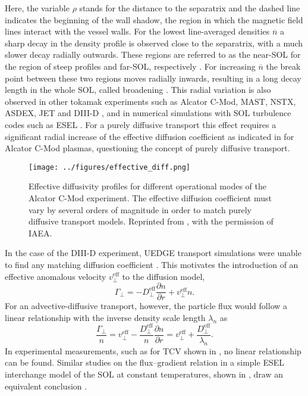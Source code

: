 Here, the variable $\rho$ stands for the distance to the separatrix and the dashed line indicates the beginning of the wall shadow, the region in which the magnetic field lines interact with the vessel walls. For the lowest line-averaged densities $\overline{n}$ a sharp decay in the density profile is observed close to the separatrix, with a much slower decay radially outwards. These regions are referred to as the near-SOL for the region of steep profiles and far-SOL, respectively \cite{labombard2001particle}. For increasing $\overline{n}$ the break point between these two regions moves radially inwards, resulting in a long decay length in the whole SOL, called broadening \cite{militello2016scrape}. This radial variation is also observed in other tokamak experiments such as Alcator C-Mod, MAST, NSTX, ASDEX, JET and DIII-D \cite{umansky1999modeling,rudakov2005far,militello2013experimental,boedo2014edge,carralero2014experimental,stangeby2000plasma,lipschultz2005comparison}, and in numerical simulations with SOL turbulence codes such as ESEL \cite{naulin2007turbulent}. For a purely diffusive transport this effect requires a significant radial increase of the effective diffusion coefficient as indicated in  for Alcator C-Mod plasmas, questioning the concept of purely diffusive transport.
\begin{figure}[t]
  \centering
  \texttt{[image: ../figures/effective\_diff.png]}
  \caption{Effective diffusivity profiles for different operational modes of the Alcator C-Mod experiment. The effective diffusion coefficient must vary by several orders of magnitude in order to match purely diffusive transport models. Reprinted from \cite{labombard2000cross}, with the permission of IAEA.}
  \label{Fig:labombard}
\end{figure}
In the case of the DIII-D experiment, UEDGE transport simulations were unable to find any matching diffusion coefficient \cite{pigarov2002tokamak}. This motivates the introduction of an effective anomalous velocity $v_\perp^\textrm{eff}$ to the diffusion model,
\begin{equation}
  \Gamma_\perp = - D_\perp^\textrm{eff} \frac{\partial n}{\partial r} + v_\perp^\textrm{eff} n.
\end{equation}
For an advective-diffusive transport, however, the particle flux would follow a linear relationship with the inverse density scale length $\lambda_n$ \cite{garcia2007turbulent} as
\begin{equation}
  \frac{\Gamma_\perp}{n} =  v_\perp^\textrm{eff} - \frac{D_\perp^\textrm{eff}}{n} \frac{\partial n}{\partial r} = v_\perp^\textrm{eff} + \frac{D_\perp^\textrm{eff}}{\lambda_n}.
\end{equation}
In experimental measurements, such as for TCV shown in , no linear relationship can be found. Similar studies on the ﬂux–gradient relation in
a simple ESEL interchange model of the SOL at
constant temperatures, shown in ,  draw an equivalent conclusion \cite{naulin2007turbulent}.

